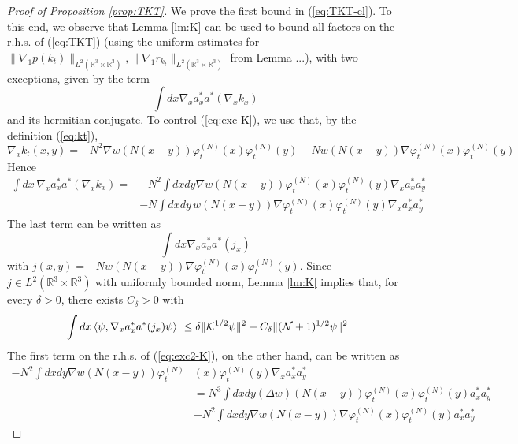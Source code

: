 \documentclass[11pt,a4paper,DIV11]{scrartcl}	%
\newcommand{\bR}{{\mathbb R}}
\newcommand{\cK}{{\cal K}}
\newcommand{\cN}{{\cal N}}
\begin{document}
\begin{proof}[Proof of Proposition \ref{prop:TKT}] 
We prove the first bound in (\ref{eq:TKT-cl}). To this end, we observe that Lemma \ref{lm:K} can be used to bound all factors on the r.h.s. of (\ref{eq:TKT})  (using the uniform estimates for $\| \nabla_1 p (k_t) \|_{L^2 (\bR^3 \times \bR^3)}, \| \nabla_1 r_{k_t} \|_{L^2 (\bR^3 \times \bR^3)}$ from Lemma ...), with two exceptions, given by the term
\begin{equation}\label{eq:exc-K} \int dx \nabla_x a^*_x a^* (\nabla_x k_x) \end{equation}
and its hermitian conjugate. To control (\ref{eq:exc-K}), we use that, by the definition (\ref{eq:kt}), 
\[ \nabla_x k_t (x,y) = - N^2 \nabla w (N (x-y)) \varphi_t^{(N)} (x) \varphi_t^{(N)} (y) - N w (N (x-y)) \nabla\varphi_t^{(N)} (x) \varphi_t^{(N)} (y)  \]
Hence
\begin{equation}\label{eq:exc2-K} \begin{split} 
\int dx \, \nabla_x a_x^* a^* (\nabla_x k_x)  = &- N^2 \int dx dy \nabla w (N (x-y)) \varphi_t^{(N)} (x) \varphi_t^{(N)} (y) \nabla_x a^*_x a_y^* \\ &- N \int dx dy \, w(N (x-y)) \nabla \varphi_t^{(N)} (x) \varphi_t^{(N)} (y) \nabla_x a_x^* a_y^*   \end{split}\end{equation}
The last term can be written as
\begin{equation} \int dx  \nabla_x a_x^* a^* (j_x) \end{equation}
with $j(x,y) = -N w(N (x-y)) \nabla \varphi_t^{(N)} (x) \varphi_t^{(N)} (y)$. Since $j \in L^2 (\bR^3 \times \bR^3)$ with uniformly bounded norm, Lemma \ref{lm:K} implies that, for every $\delta > 0$, there exists $C_\delta >0$ with
\begin{equation}\label{eq:exc3-K} \left| \int dx \, \langle \psi , \nabla_x a_x^* a^* (j_x) \psi \rangle \right| \leq \delta \| \cK^{1/2} \psi \|^2 + C_\delta \| (\cN + 1)^{1/2} \psi \|^2 \end{equation}
The first term on the r.h.s. of (\ref{eq:exc2-K}), on the other hand, can be written as
\[ \begin{split}
- N^2 \int dx dy \nabla w (N (x-y)) \varphi_t^{(N)} &(x) \varphi_t^{(N)} (y) \nabla_x a^*_x a_y^* \\ &=
 N^3 \int dx dy (\Delta w) (N (x-y)) \varphi_t^{(N)} (x) \varphi_t^{(N)} (y) a^*_x a_y^* \\ &+ N^2 \int dx dy \nabla w (N (x-y)) \nabla \varphi^{(N)}_t (x) \varphi_t^{(N)} (y) a_x^* a_y^* \end{split} \]

\end{proof}
\end{document}

